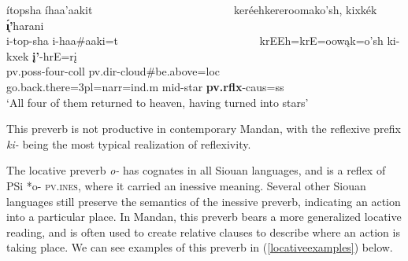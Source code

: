 \begin{exe}
\begin{xlist}
	\item \glll ítopsha íhaa'aakit ~ ~ ~ ~ ~ ~ ~ ~ ~ ~ ~ ~ ~ ~ ~ keréehkereroomako'sh, kixkék \textbf{\'{ı̨}'}harani\\
	i-top-sha i-haa\#aaki=t ~ ~ ~ ~ ~ ~ ~ ~ ~ ~ ~ ~ ~ ~ ~  krEEh=krE=oowąk=o'sh ki-kxek \textbf{į'}-hrE=rį\\
	pv.poss-\textnormal{four}-coll pv.dir-\textnormal{cloud}\#\textnormal{be.above}=loc ~ ~ ~ ~ ~ ~ ~ ~ ~ ~ ~ ~ ~ ~ ~  \textnormal{go.back.there}=3pl=narr=ind.m mid-\textnormal{star} \textbf{pv.rflx}-caus=ss\\
	\glt `All four of them returned to heaven, having turned into stars' \citep[175]{hollow1973a}
	

%	

	
\end{xlist} 

\end{exe} 

This preverb is not productive in contemporary Mandan, with the reflexive prefix \textit{ki-} being the most typical realization of reflexivity.

\label{SubParaLocative}

The locative preverb \textit{o-} has cognates in all Siouan languages, and is a reflex of PSi *o- \textsc{pv.ines}, where it carried an inessive meaning. Several other Siouan languages still preserve the semantics of the inessive preverb, indicating an action into a particular place. In Mandan, this preverb bears a more generalized locative reading, and is often used to create relative clauses to describe where an action is taking place. We can see examples of this preverb in (\ref{locativeexamples}) below.

